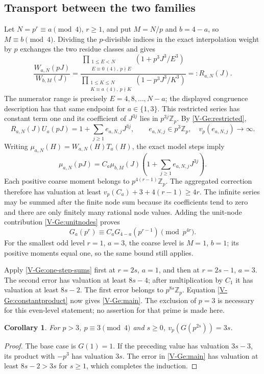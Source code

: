 \documentclass[11pt,letterpaper]{article}
\newtheorem{corollary}[theorem]{Corollary}
\numberwithin{equation}{section}
\begin{document}
\subsection{Transport between the two families}
Let $N=p^r\equiv a\pmod4$, $r\ge1$, and put $M=N/p$ and
$b=4-a$, so $M\equiv b\pmod4$. Dividing the $p$-divisible indices
in the exact interpolation weight by $p$ exchanges the two residue
classes and gives
\[
\frac{W_{a,N}(pJ)}{W_{b,M}(J)}
=\frac{\prod_{\substack{1\le E<N\\E\equiv0\ (4),\ p\nmid E}}
 (1+p^3J^3/E^3)}
{\prod_{\substack{1\le K\le N\\K\equiv a\ (4),\ p\nmid K}}
 (1-p^3J^3/K^3)}
=:R_{a,N}(J).
\]
The numerator range is precisely $E=4,8,\ldots,N-a$; the displayed
congruence description has that same endpoint for $a\in\{1,3\}$.
This restricted series has constant term one and its coefficient
of $J^{3j}$ lies in $p^{3j}\mathbb Z_p$. By \eqref{V-Ge:restricted},
\[
 R_{a,N}(J)U_a(pJ)=1+\sum_{j\ge1}e_{a,N,j}J^{3j},\qquad
 e_{a,N,j}\in p^3\mathbb Z_p,\quad
 v_p(e_{a,N,j})\longrightarrow\infty.
\]
Writing $\mu_{a,N}(H)=W_{a,N}(H)T_a(H)$, the exact model steps imply
\[
\mu_{a,N}(pJ)=C_a\mu_{b,M}(J)
\left(1+\sum_{j\ge1}e_{a,N,j}J^{3j}\right).
\]
Each positive coarse moment belongs to $p^{4(r-1)}\mathbb Z_p$.
The aggregated correction therefore has valuation at least
$v_p(C_a)+3+4(r-1)\ge4r$. The infinite series may be summed after
the finite node sum because its coefficients tend to zero and
there are only finitely many rational node values. Adding the
unit-node contribution \eqref{V-Ge:unitnodes} proves
\begin{equation}\label{V-Ge:one-step-sums}
 G_a(p^r)\equiv C_aG_{4-a}(p^{r-1})\pmod{p^{4r}}.
\end{equation}
For the smallest odd level $r=1$, $a=3$, the coarse level is
$M=1$, $b=1$; its positive moments equal one, so the same bound
still applies.

Apply \eqref{V-Ge:one-step-sums} first at $r=2s$, $a=1$, and then at
$r=2s-1$, $a=3$. The second error has valuation at least $8s-4$;
after multiplication by $C_1$ it has valuation at least $8s-2$.
The first error belongs to $p^{8s}\mathbb Z_p$. Equation
\eqref{V-Ge:constantproduct} now gives \eqref{V-Ge:main}.
The exclusion of $p=3$ is necessary for this even-level statement;
no assertion for that prime is made here.


\begin{corollary}
For $p>3$, $p\equiv3\pmod4$ and $s\ge0$,
$v_p(G(p^{2s}))=3s$.
\end{corollary}
\begin{proof}
The base case is $G(1)=1$. If the preceding value has valuation
$3s-3$, its product with $-p^3$ has valuation $3s$.
The error in \eqref{V-Ge:main} has valuation at least $8s-2>3s$
for $s\ge1$, which completes the induction.
\end{proof}
\end{document}
